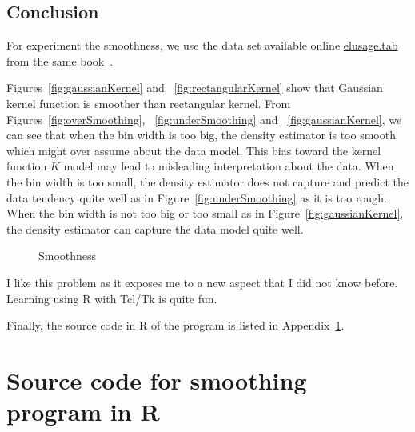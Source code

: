 \documentclass{article}
\begin{document}
 \subsection{Conclusion}
 For experiment the smoothness, we use the data set available online
 \href{http://pages.stern.nyu.edu/~jsimonof/SmoothMeth/Data/Tab/elusage.tab}{elusage.tab}
 from the same book~\cite{SimonoffSmoothingTechs}.
 
 Figures~\ref{fig:gaussianKernel} and ~\ref{fig:rectangularKernel} show that Gaussian kernel function is smoother than rectangular kernel. From
 Figures~\ref{fig:overSmoothing}, ~\ref{fig:underSmoothing} and
 ~\ref{fig:gaussianKernel}, we can see that when the bin width is too big, the
 density estimator is too smooth which might over assume about the data model.
 This bias toward the kernel function $K$ model may lead to misleading
 interpretation about the data. When the bin width is too small, the density
 estimator does not capture and predict the data tendency quite well as in
 Figure~\ref{fig:underSmoothing} as it is too rough. When the bin width is not
 too big or too small as in Figure~\ref{fig:gaussianKernel}, the
 density estimator can capture the data model quite well.
 
  \begin{figure*}[ht!]
\centering
{}

\caption{Smoothness}
\end{figure*}

 
 I like this problem as it exposes me to a new aspect that I did not know
 before. Learning using R with Tcl/Tk is quite fun.
 
 Finally, the source code in R of the program is listed in
 Appendix~\ref{sec:appSmoothing}.
 


\appendix
\section{Source code for smoothing program in R}\label{sec:appSmoothing}
\end{document}
